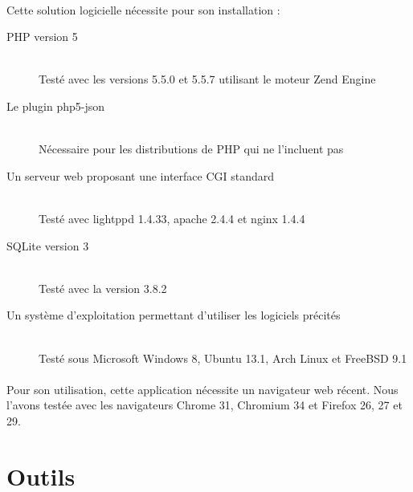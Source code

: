     \paragraph{}
        Cette solution logicielle nécessite pour son installation :
        \begin{description}
            \item[PHP version 5]\hfill \\
                Testé avec les versions 5.5.0 et 5.5.7 utilisant le moteur Zend Engine
            \item[Le plugin php5-json]\hfill \\
                Nécessaire pour les distributions de PHP qui ne l'incluent pas
            \item[Un serveur web proposant une interface CGI standard]\hfill \\
                Testé avec lightppd 1.4.33, apache 2.4.4 et nginx 1.4.4
            \item[SQLite version 3]\hfill \\
                Testé avec la version 3.8.2
            \item[Un système d'exploitation permettant d'utiliser les logiciels précités]\hfill \\
                Testé sous Microsoft Windows 8, Ubuntu 13.1, Arch Linux et FreeBSD 9.1
        \end{description}

    \paragraph{}
        Pour son utilisation, cette application nécessite un navigateur web
        récent. Nous l'avons testée avec les navigateurs Chrome 31, Chromium
        34 et Firefox 26, 27 et 29.

\pagebreak
\section{Outils}
